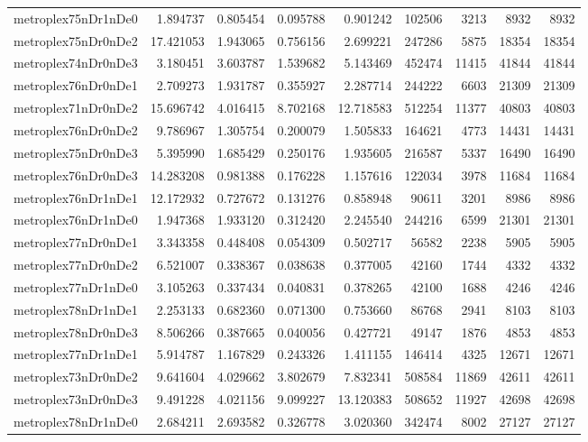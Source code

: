 \begin{longtable}{|l|r|r|r|r|r|r|r|r|}
metroplex75nDr1nDe0 & 1.894737 & 0.805454 & 0.095788 & 0.901242 & 102506 & 3213 & 8932 & 8932 \\
metroplex75nDr0nDe2 & 17.421053 & 1.943065 & 0.756156 & 2.699221 & 247286 & 5875 & 18354 & 18354 \\
metroplex74nDr0nDe3 & 3.180451 & 3.603787 & 1.539682 & 5.143469 & 452474 & 11415 & 41844 & 41844 \\
metroplex76nDr0nDe1 & 2.709273 & 1.931787 & 0.355927 & 2.287714 & 244222 & 6603 & 21309 & 21309 \\
metroplex71nDr0nDe2 & 15.696742 & 4.016415 & 8.702168 & 12.718583 & 512254 & 11377 & 40803 & 40803 \\
metroplex76nDr0nDe2 & 9.786967 & 1.305754 & 0.200079 & 1.505833 & 164621 & 4773 & 14431 & 14431 \\
metroplex75nDr0nDe3 & 5.395990 & 1.685429 & 0.250176 & 1.935605 & 216587 & 5337 & 16490 & 16490 \\
metroplex76nDr0nDe3 & 14.283208 & 0.981388 & 0.176228 & 1.157616 & 122034 & 3978 & 11684 & 11684 \\
metroplex76nDr1nDe1 & 12.172932 & 0.727672 & 0.131276 & 0.858948 & 90611 & 3201 & 8986 & 8986 \\
metroplex76nDr1nDe0 & 1.947368 & 1.933120 & 0.312420 & 2.245540 & 244216 & 6599 & 21301 & 21301 \\
metroplex77nDr0nDe1 & 3.343358 & 0.448408 & 0.054309 & 0.502717 & 56582 & 2238 & 5905 & 5905 \\
metroplex77nDr0nDe2 & 6.521007 & 0.338367 & 0.038638 & 0.377005 & 42160 & 1744 & 4332 & 4332 \\
metroplex77nDr1nDe0 & 3.105263 & 0.337434 & 0.040831 & 0.378265 & 42100 & 1688 & 4246 & 4246 \\
metroplex78nDr1nDe1 & 2.253133 & 0.682360 & 0.071300 & 0.753660 & 86768 & 2941 & 8103 & 8103 \\
metroplex78nDr0nDe3 & 8.506266 & 0.387665 & 0.040056 & 0.427721 & 49147 & 1876 & 4853 & 4853 \\
metroplex77nDr1nDe1 & 5.914787 & 1.167829 & 0.243326 & 1.411155 & 146414 & 4325 & 12671 & 12671 \\
metroplex73nDr0nDe2 & 9.641604 & 4.029662 & 3.802679 & 7.832341 & 508584 & 11869 & 42611 & 42611 \\
metroplex73nDr0nDe3 & 9.491228 & 4.021156 & 9.099227 & 13.120383 & 508652 & 11927 & 42698 & 42698 \\
metroplex78nDr1nDe0 & 2.684211 & 2.693582 & 0.326778 & 3.020360 & 342474 & 8002 & 27127 & 27127 \\

\end{longtable}
